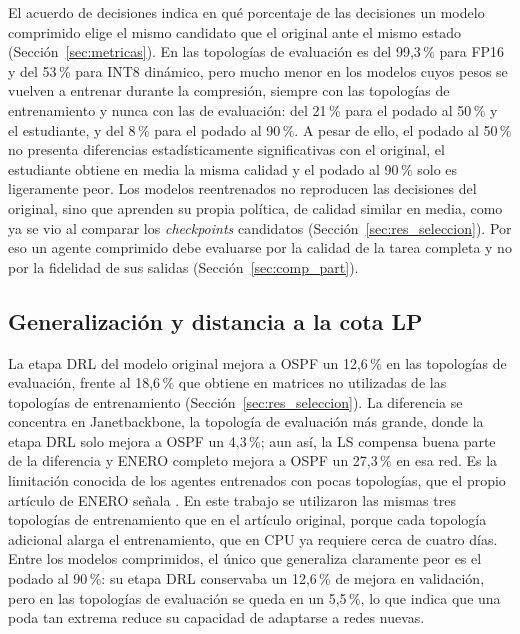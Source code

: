 El acuerdo de decisiones indica en qué porcentaje de las decisiones un modelo comprimido elige el mismo candidato que el original ante el mismo estado (Sección~\ref{sec:metricas}). En las topologías de evaluación es del 99,3\,\% para FP16 y del 53\,\% para INT8 dinámico, pero mucho menor en los modelos cuyos pesos se vuelven a entrenar durante la compresión, siempre con las topologías de entrenamiento y nunca con las de evaluación: del 21\,\% para el podado al 50\,\% y el estudiante, y del 8\,\% para el podado al 90\,\%. A pesar de ello, el podado al 50\,\% no presenta diferencias estadísticamente significativas con el original, el estudiante obtiene en media la misma calidad y el podado al 90\,\% solo es ligeramente peor. Los modelos reentrenados no reproducen las decisiones del original, sino que aprenden su propia política, de calidad similar en media, como ya se vio al comparar los \textit{checkpoints} candidatos (Sección~\ref{sec:res_seleccion}). Por eso un agente comprimido debe evaluarse por la calidad de la tarea completa y no por la fidelidad de sus salidas (Sección~\ref{sec:comp_part}).

\subsection{Generalización y distancia a la cota LP}\label{sec:res_generalizacion}

La etapa DRL del modelo original mejora a OSPF un 12,6\,\% en las topologías de evaluación, frente al 18,6\,\% que obtiene en matrices no utilizadas de las topologías de entrenamiento (Sección~\ref{sec:res_seleccion}). La diferencia se concentra en Janetbackbone, la topología de evaluación más grande, donde la etapa DRL solo mejora a OSPF un 4,3\,\%; aun así, la LS compensa buena parte de la diferencia y ENERO completo mejora a OSPF un 27,3\,\% en esa red. Es la limitación conocida de los agentes entrenados con pocas topologías, que el propio artículo de ENERO señala \cite{ALMASAN2022109166}. En este trabajo se utilizaron las mismas tres topologías de entrenamiento que en el artículo original, porque cada topología adicional alarga el entrenamiento, que en CPU ya requiere cerca de cuatro días. Entre los modelos comprimidos, el único que generaliza claramente peor es el podado al 90\,\%: su etapa DRL conservaba un 12,6\,\% de mejora en validación, pero en las topologías de evaluación se queda en un 5,5\,\%, lo que indica que una poda tan extrema reduce su capacidad de adaptarse a redes nuevas.

